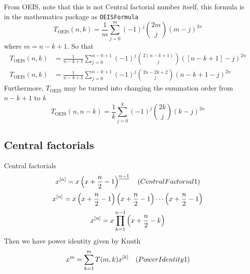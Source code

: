 From OEIS, note that this is not Central factorial number itself, this formula is in the mathematica package as
\texttt{OEISFormula}
\begin{equation*}
    T_{\mathrm{OEIS}} (n,k) = \frac{1}{m} \sum_{j=0}^{m} (-1)^{j} \binom{2m}{j} (m-j)^{2n}
\end{equation*}
where $m=n-k+1$.
So that
\begin{equation}
    \begin{split}
        T_{\mathrm{OEIS}} (n,k) &= \frac{1}{n-k+1} \sum_{j=0}^{n-k+1} (-1)^{j} \binom{2(n-k+1)}{j} ([n-k+1]-j)^{2n} \\
        T_{\mathrm{OEIS}} (n,k) &= \frac{1}{n-k+1} \sum_{j=0}^{n-k+1} (-1)^{j} \binom{2n-2k+2}{j} (n-k+1-j)^{2n}
    \end{split}\label{eq:luschny-oeis}
\end{equation}
Furthermore, $T_{\mathrm{OEIS}}$ may be turned into changing the summation order from $n-k+1$ to $k$
\begin{equation*}
    T_{\mathrm{OEIS}} (n, n-k) = \frac{1}{k} \sum_{j=0}^{k} (-1)^{j} \binom{2k}{j} (k-j)^{2n}
\end{equation*}

\subsection{Central factorials}\label{subsec:central-factorials}
Central factorials
\begin{equation*}
    x^{[n]} = x \left(x+\frac{n}{2}-1 \right)^{\underline{n-1}} \quad
    (CentralFactorial1)
\end{equation*}
\begin{equation*}
    x^{[n]} = x \left( x+\frac{n}{2}-1 \right) \left( x+\frac{n}{2}-1 \right) \cdots \left (x+\frac{n}{2}-1 \right)
\end{equation*}
\begin{equation*}
    x^{[n]} = x \prod_{k=1}^{n-1} \left( x+\frac{n}{2}-k \right)
\end{equation*}
Then we have power identity given by Knuth
\begin{equation*}
    x^m = \sum_{k=1}^{m} T(m, k) x^{[k]} \quad
    (PowerIdentity1)
\end{equation*}